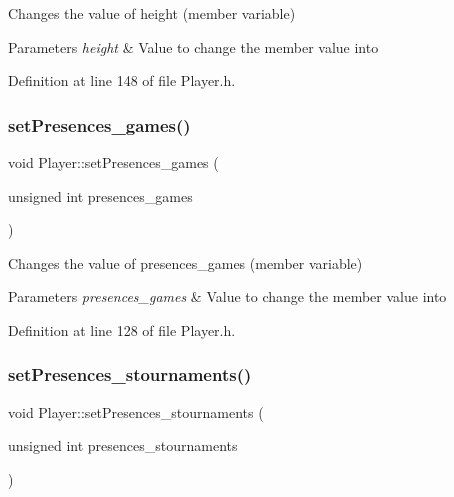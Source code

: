 Changes the value of height (member variable) 


\begin{DoxyParams}{Parameters}
{\em height} & Value to change the member value into \\
\hline
\end{DoxyParams}


Definition at line 148 of file Player.\+h.

\hypertarget{class_player_a6e7482dfac54ccf8c7804dd909b70143}{}\label{class_player_a6e7482dfac54ccf8c7804dd909b70143} 
\subsubsection{\texorpdfstring{set\+Presences\+\_\+games()}{setPresences\_games()}}
{\footnotesize\ttfamily void Player\+::set\+Presences\+\_\+games (\begin{DoxyParamCaption}\item[{unsigned int}]{presences\+\_\+games }\end{DoxyParamCaption})\hspace{0.3cm}{\ttfamily [inline]}}



Changes the value of presences\+\_\+games (member variable) 


\begin{DoxyParams}{Parameters}
{\em presences\+\_\+games} & Value to change the member value into \\
\hline
\end{DoxyParams}


Definition at line 128 of file Player.\+h.

\hypertarget{class_player_a95c04115cff22ff76782c475f288561d}{}\label{class_player_a95c04115cff22ff76782c475f288561d} 
\subsubsection{\texorpdfstring{set\+Presences\+\_\+stournaments()}{setPresences\_stournaments()}}
{\footnotesize\ttfamily void Player\+::set\+Presences\+\_\+stournaments (\begin{DoxyParamCaption}\item[{unsigned int}]{presences\+\_\+stournaments }\end{DoxyParamCaption})\hspace{0.3cm}{\ttfamily [inline]}}



